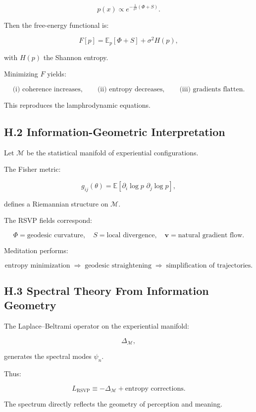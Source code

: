 \documentclass[12pt]{article}
\begin{document}
\[
p(x) \propto e^{-\frac{1}{\sigma^2} (\Phi + S)}.
\]

Then the free-energy functional is:

\[
F[p]
=
\mathbb{E}_p[\Phi + S] + \sigma^2 H(p),
\]

with $H(p)$ the Shannon entropy.

Minimizing $F$ yields:

\[
\text{(i) coherence increases},
\qquad
\text{(ii) entropy decreases},
\qquad
\text{(iii) gradients flatten}.
\]

This reproduces the lamphrodynamic equations.

\subsection*{H.2 Information-Geometric Interpretation}

Let $\mathcal{M}$ be the statistical manifold of experiential configurations.

The Fisher metric:

\[
g_{ij}(\theta)
=
\mathbb{E}[\partial_i \log p \,\, \partial_j \log p],
\]

defines a Riemannian structure on $\mathcal{M}$.

The RSVP fields correspond:

\[
\Phi = \text{geodesic curvature},
\quad
S = \text{local divergence},
\quad
\mathbf{v} = \text{natural gradient flow}.
\]

Meditation performs:

\[
\text{entropy minimization}
\;\Rightarrow\;
\text{geodesic straightening}
\;\Rightarrow\;
\text{simplification of trajectories}.
\]

\subsection*{H.3 Spectral Theory From Information Geometry}

The Laplace–Beltrami operator on the experiential manifold:

\[
\Delta_{\mathcal{M}},
\]

generates the spectral modes $\psi_n$.

Thus:

\[
L_{\text{RSVP}}
\equiv
-\Delta_{\mathcal{M}} + \text{entropy corrections}.
\]

The spectrum directly reflects the geometry of perception and meaning.
\end{document}
